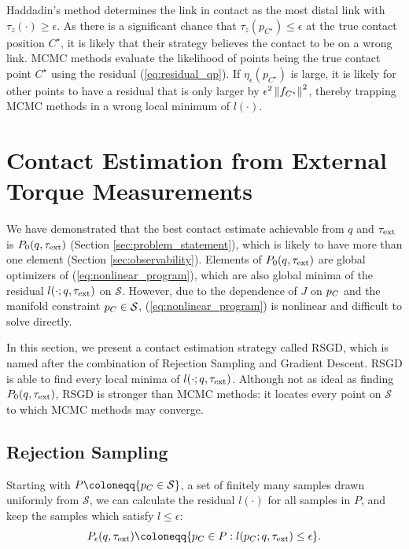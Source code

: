 Haddadin's method \cite{haddadin2017robot} determines the link in contact as the most distal link with $\tau_z(\cdot) \geq \epsilon$. As there is a significant chance that $\tau_z(p_{C^\star}) \leq \epsilon$ at the true contact position $C^\star$, it is likely that their strategy believes the contact to be on a wrong link. MCMC methods \cite{manuelli2016localizing, zwiener2019armcl} evaluate the likelihood of points being the true contact point $C^\star$ using the residual (\ref{eq:residual_qp}). If $\eta_\epsilon(p_{C^\star})$ is large, it is likely for other points to have a residual that is only larger by $\epsilon^2 \left\lVert{f_{C^\star}}\right\rVert^2$, thereby trapping MCMC methods in a wrong local minimum of $l(\cdot)$. 

\section{Contact Estimation from External Torque Measurements}
We have demonstrated that the best contact estimate achievable from $q$ and $\tau_{\text{ext}}$ is $P_0(q, \tau_{\text{ext}})$ (Section \ref{sec:problem_statement}), which is likely to have more than one element (Section \ref{sec:observability}). Elements of $P_0(q, \tau_{\text{ext}})$ are global optimizers of (\ref{eq:nonlinear_program}), which are also global minima of the residual $l(\cdot; q, \tau_{\text{ext}})$ on $\mathcal{S}$. However, due to the dependence of ${J}$ on $p_{C}$ and the manifold constraint $p_{C} \in \mathcal{S}$, (\ref{eq:nonlinear_program}) is nonlinear and difficult to solve directly.

In this section, we present a contact estimation strategy called RSGD, which is named after the combination of Rejection Sampling and Gradient Descent. RSGD is able to find every local minima of $l(\cdot; q, \tau_{\text{ext}})$. Although not as ideal as finding $P_{0}(q, \tau_{\text{ext}})$, RSGD is stronger than MCMC methods: it locates every point on $\mathcal{S}$ to which MCMC methods may converge.

\subsection{Rejection Sampling}
Starting with $P \coloneqq \{\pCbar \in \mathcal{S} \}$, a set of finitely many samples drawn uniformly from $\mathcal{S}$, we can calculate the residual $l(\cdot)$ for all samples in $P$, and keep the samples which satisfy $ l \leq \epsilon$:
\begin{equation}
P_{\epsilon}(q, \tauE) \coloneqq \{\pCbar \in P : l(\pCbar; q, \tauE) \leq \epsilon\}. 
\end{equation}

